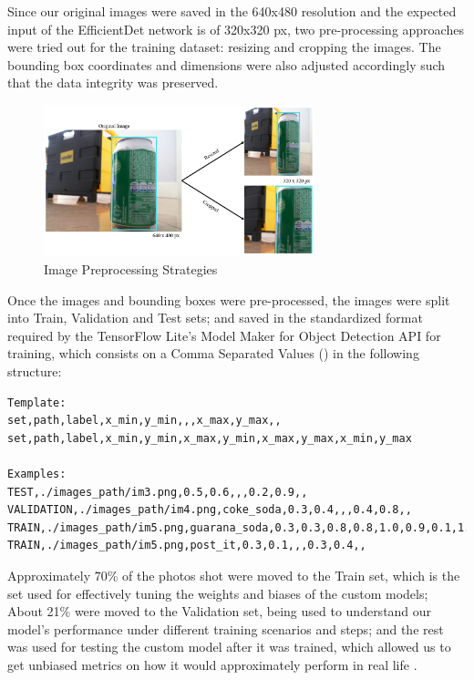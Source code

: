 \documentclass[openright]{normas-utf-tex} %
\begin{document}
Since our original images were saved in the 640x480 resolution and the expected
input of the EfficientDet network is of 320x320 px, two pre-processing
approaches were tried out for the training dataset: resizing and cropping the
images. The bounding box coordinates and dimensions were also adjusted
accordingly such that the data integrity was preserved. 

\begin{figure}[H]
	\centering
	\includegraphics[width=0.7\textwidth]{./images/image_preprocessing.png}
	\caption[Image Preprocessing Strategies]{Image Preprocessing Strategies}
\end{figure}

Once the images and bounding boxes were pre-processed, the images were split
into Train, Validation and Test sets; and saved in the standardized format
required by the TensorFlow Lite's Model Maker for Object Detection API for
training, which consists on a Comma Separated Values () in the following structure:

\begin{lstlisting}[caption={CSV format for specifying the Train, Test and Validation 
	image sets for training models using the TensorFlow's Model Maker API for Object 
	Detection},label={lst:csvFormatTrain}]
Template:
set,path,label,x_min,y_min,,,x_max,y_max,,
set,path,label,x_min,y_min,x_max,y_min,x_max,y_max,x_min,y_max

Examples:
TEST,./images_path/im3.png,0.5,0.6,,,0.2,0.9,,
VALIDATION,./images_path/im4.png,coke_soda,0.3,0.4,,,0.4,0.8,,
TRAIN,./images_path/im5.png,guarana_soda,0.3,0.3,0.8,0.8,1.0,0.9,0.1,1.0
TRAIN,./images_path/im5.png,post_it,0.3,0.1,,,0.3,0.4,,
\end{lstlisting}

Approximately 70\% of the photos shot were moved to the Train set, which is the set used for effectively 
tuning the weights and biases of the custom models; About 21\% were moved to the Validation set, 
being used to understand our model's performance under different training scenarios and steps; 
and the rest was used for testing the custom model after it was trained, which allowed us to 
get unbiased metrics on how it would approximately perform in real life \cite{MluExplain}.
\end{document}
